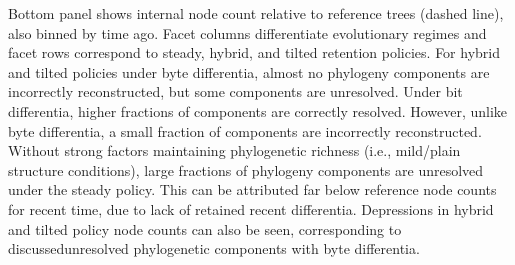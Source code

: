 \begin{figure*}
{  Bottom panel shows internal node count relative to reference trees (dashed line), also binned by time ago.
  Facet columns differentiate evolutionary regimes and facet rows correspond to steady, hybrid, and tilted retention policies.
  For hybrid and tilted policies under byte differentia, almost no phylogeny components are incorrectly reconstructed, but some components are unresolved.
  Under bit differentia, higher fractions of components are correctly resolved.
  However, unlike byte differentia, a small fraction of components are incorrectly reconstructed.
  Without strong factors maintaining phylogenetic richness (i.e., mild/plain structure conditions), large fractions of phylogeny components are unresolved under the steady policy.
  This can be attributed far below reference node counts for recent time, due to lack of retained recent differentia.
  Depressions in hybrid and tilted policy node counts can also be seen, corresponding to discussedunresolved phylogenetic components with byte differentia.
  }
  \label{fig:recency-structure}

\end{figure*}
